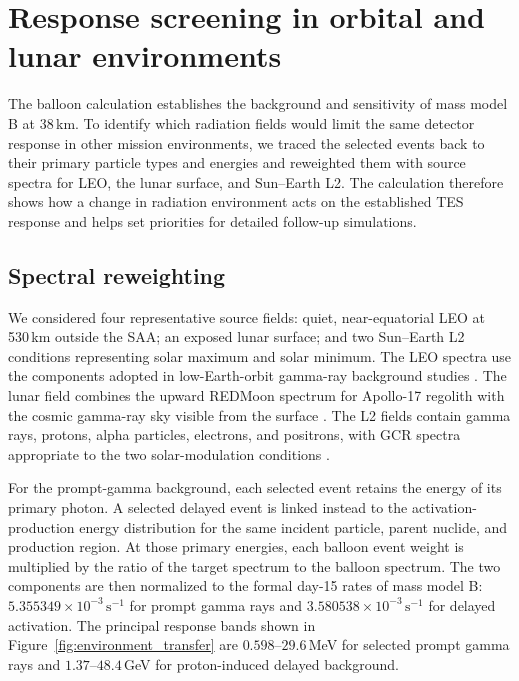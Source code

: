 \documentclass[11pt]{article}
\newcommand{\revblue}[1]{\textcolor{revisionblue}{#1}}
\newcommand{\cps}{\ensuremath{\,\mathrm{s^{-1}}}}
\begin{document}
\FloatBarrier

\section{Response screening in orbital and lunar environments}
\label{sec:environment_screening}

The balloon calculation establishes the background and sensitivity of mass
model B at 38\,km. To identify which radiation fields would limit the same
detector response in other mission environments, we traced the selected events
back to their primary particle types and energies and reweighted them with
source spectra for LEO, the lunar surface, and Sun--Earth L2. The calculation
therefore shows how a change in radiation environment acts on the established
TES response and helps set priorities for detailed follow-up simulations.

\subsection{Spectral reweighting}

We considered four representative source fields: quiet, near-equatorial LEO at
530\,km outside the SAA; an exposed lunar surface; and two Sun--Earth L2
conditions representing solar maximum and solar minimum. The LEO spectra use
the components adopted in low-Earth-orbit gamma-ray background studies
\cite{Cumani2019LEO}. The lunar field combines the upward REDMoon spectrum for
Apollo-17 regolith with the cosmic gamma-ray sky visible from the surface
\cite{Dobynde2021REDMoon}. The L2 fields contain gamma rays, protons, alpha
particles, electrons, and positrons, with GCR spectra appropriate to the two
solar-modulation conditions
\cite{Lotti2021Athena,Usoskin2005,Kuznetsov2017}.

For the \revblue{prompt-gamma background}, each selected event retains the energy of
its primary photon. A selected delayed event is linked instead to the
activation-production energy distribution for the same incident particle,
parent nuclide, and production region. At those primary energies, each balloon
event weight is multiplied by the ratio of the target spectrum to the balloon
spectrum. The two components are then normalized to the formal day-15 rates of
mass model B: $5.355349\times10^{-3}\cps$ for \revblue{prompt gamma rays} and
$3.580538\times10^{-3}\cps$ for delayed activation. The principal response
bands shown in Figure~\ref{fig:environment_transfer} are
$0.598$--$29.6$\,MeV for selected prompt gamma rays and
$1.37$--$48.4$\,GeV for proton-induced delayed background.
\end{document}
